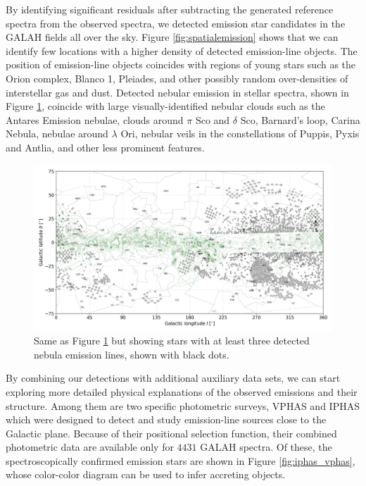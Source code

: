 By identifying significant residuals after subtracting the generated reference spectra from the observed spectra, we detected emission star candidates in the GALAH fields all over the sky. Figure \ref{fig:spatialemission} shows that we can identify few locations with a higher density of detected emission-line objects. The position of emission-line objects coincides with regions of young stars such as the Orion complex, Blanco 1, Pleiades, and other possibly random over-densities of interstellar gas and dust. Detected nebular emission in stellar spectra, shown in Figure \ref{fig:spatialnebular}, coincide with large visually-identified nebular clouds \citep[by comparing detected locations with the red all-sky photographic composite of The Second Digitized Sky Survey, described by][]{2000ASPC..216..145M} such as the Antares Emission nebulae, clouds around $\pi$ Sco and $\delta$ Sco, Barnard's loop, Carina Nebula, nebulae around $\lambda$ Ori, nebular veils in the constellations of Puppis, Pyxis and Antlia, and other less prominent features.

\begin{figure}
	\centering
	\includegraphics[width=\textwidth]{reddening_d2000_n720_cont_wnebular.png}
	\caption{Same as Figure \ref{fig:spatialnebular} but showing stars with at least three detected nebula emission lines, shown with black dots.}
	\label{fig:spatialnebular}
\end{figure}

By combining our detections with additional auxiliary data sets, we can start exploring more detailed physical explanations of the observed emissions and their structure. Among them are two specific photometric surveys, VPHAS \citep{2014MNRAS.440.2036D} and IPHAS \citep{2008MNRAS.384.1277W} which were designed to detect and study emission-line sources close to the Galactic plane. Because of their positional selection function, their combined photometric data are available only for $4431$ GALAH spectra. Of these, the spectroscopically confirmed emission stars are shown in Figure \ref{fig:iphas_vphas}, whose color-color diagram can be used to infer accreting objects.

